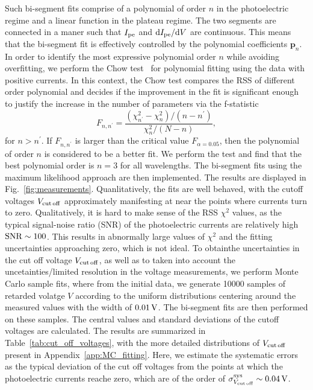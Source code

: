\documentclass[aps,twocolumn,secnumarabic,balancelastpage,amsmath,amssymb,nofootinbib,floatfix]{revtex4-1}
\newcommand{\V}{\,{\rm V}}
\begin{document}
Such bi-segment fits comprise of a polynomial of order $n$ in the photoelectric regime and a linear function in the plateau regime. The two segments are connected in a maner such that $I_{\rm{pe}}$ and ${\rm{d}}I_{\rm{pe}} / {\rm{d}}V$ are continuous. This means that the bi-segment fit is effectively controlled by the polynomial coefficients $\boldsymbol{p}_n$. In order to identify the most expressive polynomial order $n$ while avoiding overfitting, we perform the Chow test~\citep{Chow1960} for polynomial fitting using the data with positive currents. In this context, the Chow test compares the RSS of different order polynomial and decides if the improvement in the fit is significant enough to justify the increase in the number of parameters via the f-statistic
\begin{equation}
    \label{eqn:chow_f_stat}
    F_{n,n^{\prime}} = \frac{(\chi^2_{n^{\prime}} - \chi^2_{n}) / (n - n^{\prime})}{\chi^2_n / (N - n)},
\end{equation}
for $n > n^{\prime}$. If $F_{n,n^{\prime}}$ is larger than the critical value $F_{\alpha=0.05}$, then the polynomial of order $n$ is considered to be a better fit. We perform the test and find that the best polynomial order is $n=3$ for all wavelengths. The bi-segment fits using the maximum likelihood approach are then implemented. The results are displayed in Fig.~\ref{fig:measurements}. Quanlitatively, the fits are well behaved, with the cutoff voltages $V_{\rm{cut\,off}}$ approximately manifesting at near the points where currents turn to zero. Qualitatively, it is hard to make sense of the RSS $\chi^2$ values, as the typical signal-noise ratio (SNR) of the photoelectric currents are relatively high ${\rm{SNR}} \sim 100$. This results in abnormally large values of $\chi^2$ and the fitting uncertainties approaching zero, which is not ideal. To obtainthe uncertainties in the cut off voltage $V_{\rm{cut\,off}}$, as well as to taken into account the uncetainties/limited resolution in the voltage measurements, we perform Monte Carlo sample fits, where from the initial data, we generate 10000 samples of retarded volatge $V$ according to the uniform distributions centering around the measured values with the width of $0.01\V$. The bi-segment fits are then performed on these samples. The central values and standard deviations of the cutoff voltages are calculated. The results are summarized in Table~\ref{tab:cut_off_voltages}, with the more detailed distributions of $V_{\rm{cut\,off}}$ present in Appendix~\ref{app:MC_fitting}. Here, we estimate the systematic errors as the typical deviation of the cut off voltages from the points at which the photoelectric currents reache zero, which are of the order of $\sigma_{V_{\rm{cut\,off}}}^{\rm{sys}} \sim 0.04\V$.
\end{document}
